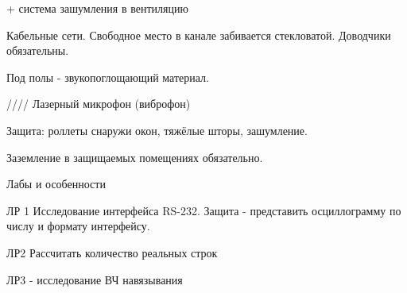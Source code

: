 \documentclass[a4paper,12pt]{report}
\begin{document}
	+ система зашумления в вентиляцию
	
	Кабельные сети. Свободное место в канале забивается стекловатой. Доводчики обязательны.
	
	Под полы - звукопоглощающий материал. 
	
	
	////
	Лазерный микрофон (виброфон)
	
	Защита: роллеты снаружи окон, тяжёлые шторы, зашумление.
	
	Заземление в защищаемых помещениях обязательно.
	
	
	Лабы и особенности
	
	ЛР 1 
	Исследование интерфейса RS-232. 
	Защита - представить осциллограмму по числу и формату интерфейсу.
	
	ЛР2 
	Рассчитать количество реальных строк
	
	ЛР3 - исследование ВЧ навязывания
	
\end{document}
